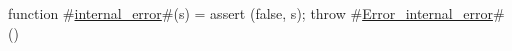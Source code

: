 function #\hyperref[sailRISCVzinternalzyerror]{internal\_error}#(s) = {
    assert (false, s);
    throw #\hyperref[sailRISCVzErrorzyinternalzyerror]{Error\_internal\_error}#()
}
